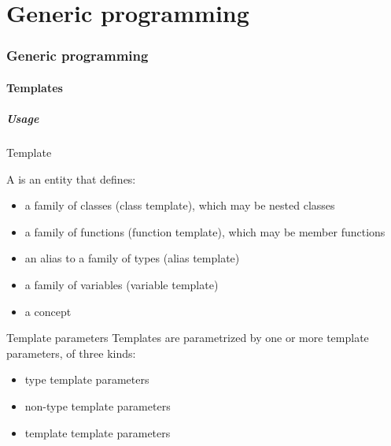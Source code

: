\part{Generic programming}

\section{Generic programming}

\subsection{Templates}

\subsubsection{Usage}

\begin{frame}{Template}{}
  \begin{definition}[Template]
    A  is an entity that defines:
    \begin{itemize}
    \item
      a family of classes (class template), which may be nested classes
    \item
      a family of functions (function template), which may be member functions
    \item
      an alias to a family of types (alias template)
    \item
      a family of variables (variable template)
    \item
      a concept
    \end{itemize}
  \end{definition}

  \begin{block}{Template parameters}
    Templates are parametrized by one or more template parameters, of three kinds:
    \begin{itemize}
    \item
      type template parameters
    \item
      non-type template parameters
    \item
      template template parameters
    \end{itemize}
  \end{block}
\end{frame}

